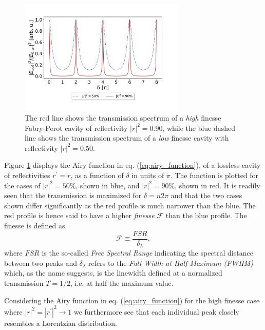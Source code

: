 \begin{figure}[h!]
    \centering
    \includegraphics[width=0.7\textwidth]{figures/fabry_perot_high_and_low_finesse.pdf}
    \caption{The red line shows the transmission spectrum of a \emph{high} finesse Fabry-Perot cavity of reflectivity $|r|^2 = 0.90$, while the blue dashed line shows the transmission spectrum of a \emph{low} finesse cavity with reflectivity $|r|^2 = 0.50$.}
    \label{fig:fabry_perot_trans}
\end{figure}

Figure \ref{fig:fabry_perot_trans} displays the Airy function in eq. (\ref{eq:airy_function}), of a lossless cavity of reflectivities $r^{\prime} = r$, as a function of $\delta$ in units of $\pi$. The function is plotted for the cases of $|r|^2 = 50 \%$, shown in blue, and $|r|^2 = 90 \%$, shown in red. It is readily seen that the transmission is maximized for $\delta = n 2 \pi$ and that the two cases shown differ significantly as the red profile is much narrower than the blue. The red profile is hence said to have a higher \emph{finesse} $\mathcal{F}$ than the blue profile. The finesse is defined as
\begin{equation}
    \mathcal{F} \equiv \frac{FSR}{\delta_{\lambda}},
    \label{eq:finesse_definition}
\end{equation}
where $FSR$ is the so-called \emph{Free Spectral Range} indicating the spectral distance between two peaks and $\delta_{\lambda}$ refers to the \emph{Full Width at Half Maximum (FWHM)} which, as the name suggests, is the linewidth defined at a normalized transmission $T=1/2$, i.e. at half the maximum value. 

Considering the Airy function in eq. (\ref{eq:airy_function}) for the high finesse case where $|r|^2 = |r^{\prime}|^2 \rightarrow 1$ we furthermore see that each individual peak closely resembles a Lorentzian distribution. 

